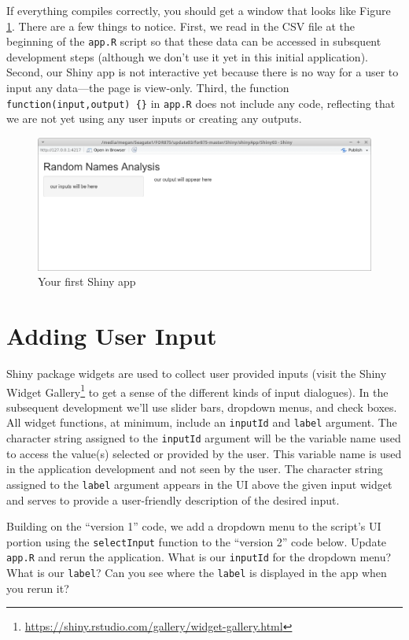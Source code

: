 \documentclass[]{krantz}
\renewcommand{\href}[2]{#2\footnote{\url{#1}}}
\begin{document}
If everything compiles correctly, you should get a window that looks
like Figure \ref{fig:fig2}. There are a few things to notice. First, we
read in the CSV file at the beginning of the \texttt{app.R} script so
that these data can be accessed in subsquent development steps (although
we don't use it yet in this initial application). Second, our Shiny app
is not interactive yet because there is no way for a user to input any
data---the page is view-only. Third, the function
\texttt{function(input,output)\ \{\}} in \texttt{app.R} does not include
any code, reflecting that we are not yet using any user inputs or
creating any outputs.

\begin{figure}
\includegraphics[width=1\linewidth]{../figures/appSimple} \caption{Your first Shiny app}\label{fig:fig2}
\end{figure}

\section{Adding User Input}\label{adding-user-input}

Shiny package widgets are used to collect user provided inputs (visit
the \href{https://shiny.rstudio.com/gallery/widget-gallery.html}{Shiny
Widget Gallery} to get a sense of the different kinds of input
dialogues). In the subsequent development we'll use slider bars,
dropdown menus, and check boxes. All widget functions, at minimum,
include an \texttt{inputId} and \texttt{label} argument. The character
string assigned to the \texttt{inputId} argument will be the variable
name used to access the value(s) selected or provided by the user. This
variable name is used in the application development and not seen by the
user. The character string assigned to the \texttt{label} argument
appears in the UI above the given input widget and serves to provide a
user-friendly description of the desired input.

Building on the ``version 1'' code, we add a dropdown menu to the
script's UI portion using the \texttt{selectInput} function to the
``version 2'' code below. Update \texttt{app.R} and rerun the
application. What is our \texttt{inputId} for the dropdown menu? What is
our \texttt{label}? Can you see where the \texttt{label} is displayed in
the app when you rerun it?
\end{document}
